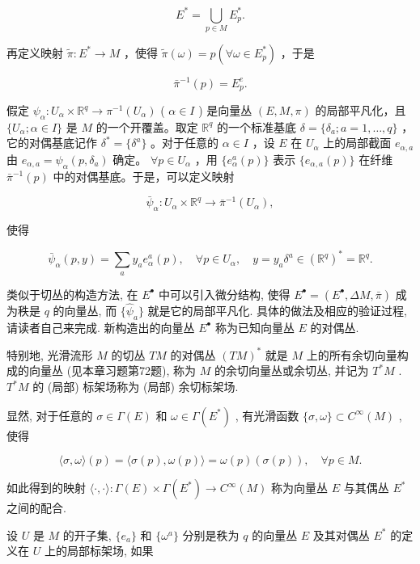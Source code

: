 $$
E ^ {*} = \bigcup_ {p \in M} E _ {p} ^ {*}.
$$

再定义映射  $\tilde{\pi}:E^{*}\to M$  ，使得  $\tilde{\pi} (\omega) = p(\forall \omega \in E_p^*)$  ，于是

$$
\bar {\pi} ^ {- 1} (p) = E _ {p} ^ {e}.
$$

假定  $\psi_{\alpha}: U_{\alpha} \times \mathbb{R}^{q} \to \pi^{-1}(U_{\alpha})$  ( $\alpha \in I$ ) 是向量丛  $(E, M, \pi)$  的局部平凡化，且  $\{U_{\alpha}; \alpha \in I\}$  是  $M$  的一个开覆盖。取定  $\mathbb{R}^{q}$  的一个标准基底  $\delta = \{\delta_{a}; a = 1, \dots, q\}$ ，它的对偶基底记作  $\delta^{*} = \{\delta^{a}\}$ 。对于任意的  $\alpha \in I$ ，设  $E$  在  $U_{\alpha}$  上的局部截面  $e_{\alpha, a}$  由  $e_{\alpha, a} = \psi_{\alpha}(p, \delta_{a})$  确定。 $\forall p \in U_{\alpha}$ ，用  $\{e_{\alpha}^{a}(p)\}$  表示  $\{e_{\alpha, a}(p)\}$  在纤维  $\bar{\pi}^{-1}(p)$  中的对偶基底。于是，可以定义映射

$$
\bar {\psi} _ {\alpha}: U _ {\alpha} \times \mathbb {R} ^ {q} \rightarrow \bar {\pi} ^ {- 1} (U _ {\alpha}),
$$

使得

$$
\bar {\psi} _ {\alpha} (p, y) = \sum_ {a} y _ {a} e _ {\alpha} ^ {a} (p), \quad \forall p \in U _ {\alpha}, \quad y = y _ {a} \delta^ {a} \in (\mathbb {R} ^ {q}) ^ {*} = \mathbb {R} ^ {q}.
$$

类似于切丛的构造方法, 在  $E^{\bullet}$  中可以引入微分结构, 使得  $E^{\bullet} = (E^{\bullet}, \Delta M, \bar{\pi})$  成为秩是  $q$  的向量丛, 而  $\{\hat{\psi}_a\}$  就是它的局部平凡化. 具体的做法及相应的验证过程, 请读者自己来完成. 新构造出的向量丛  $E^{\bullet}$  称为已知向量丛  $E$  的对偶丛.

特别地, 光滑流形  $M$  的切丛  $TM$  的对偶丛  $(TM)^{*}$  就是  $M$  上的所有余切向量构成的向量丛 (见本章习题第72题), 称为  $M$  的余切向量丛或余切丛, 并记为  $T^{*}M$ .  $T^{*}M$  的 (局部) 标架场称为 (局部) 余切标架场.

显然, 对于任意的  $\sigma \in \Gamma(E)$  和  $\omega \in \Gamma(E^{*})$ , 有光滑函数  $\{\sigma, \omega\} \subset C^{\infty}(M)$ , 使得

$$
\langle \sigma , \omega \rangle (p) = \langle \sigma (p), \omega (p) \rangle = \omega (p) (\sigma (p)), \quad \forall p \in M.
$$

如此得到的映射  $\langle \cdot, \cdot \rangle : \Gamma(E) \times \Gamma(E^{*}) \to C^{\infty}(M)$  称为向量丛  $E$  与其偶丛  $E^{*}$  之间的配合.

设  $U$  是  $M$  的开子集,  $\{e_a\}$  和  $\{\omega^a\}$  分别是秩为  $q$  的向量丛  $E$  及其对偶丛  $E^*$  的定义在  $U$  上的局部标架场, 如果

